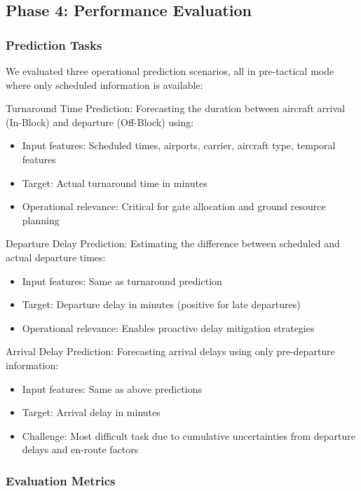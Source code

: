 \documentclass[conference]{IEEEtran}
\begin{document}
\subsection{Phase 4: Performance Evaluation}

\subsubsection{Prediction Tasks}

We evaluated three operational prediction scenarios, all in pre-tactical mode where only scheduled information is available:

Turnaround Time Prediction: 
Forecasting the duration between aircraft arrival (In-Block) and departure (Off-Block) using:
\begin{itemize}
    \item Input features: Scheduled times, airports, carrier, aircraft type, temporal features
    \item Target: Actual turnaround time in minutes
    \item Operational relevance: Critical for gate allocation and ground resource planning
\end{itemize}

Departure Delay Prediction:
Estimating the difference between scheduled and actual departure times:
\begin{itemize}
    \item Input features: Same as turnaround prediction
    \item Target: Departure delay in minutes (positive for late departures)
    \item Operational relevance: Enables proactive delay mitigation strategies
\end{itemize}

Arrival Delay Prediction:
Forecasting arrival delays using only pre-departure information:
\begin{itemize}
    \item Input features: Same as above predictions
    \item Target: Arrival delay in minutes
    \item Challenge: Most difficult task due to cumulative uncertainties from departure delays and en-route factors
\end{itemize}

\subsubsection{Evaluation Metrics}
\end{document}
